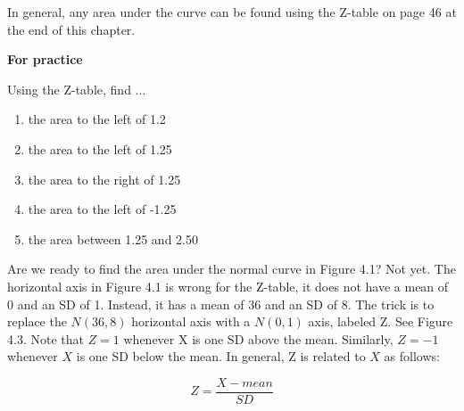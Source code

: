 \documentclass[11pt, chapterprefix=true]{scrbook}\usepackage[]{graphicx}\usepackage[]{color}
\begin{document}
In general, any area under the curve can be found using the Z-table on page 46 at the end of this chapter.

\begin{minipage}[ht]{3cm}

\textbf{For practice}
\end{minipage}
\begin{minipage}[ht]{6cm}

\parbox{6cm}{
  Using the Z-table, find $\dots$

  \begin{enumerate}
  \item the area to the left of 1.2
  \item the area to the left of 1.25
  \item the area to the right of 1.25
  \item the area to the left of -1.25
  \item the area between 1.25 and 2.50
  \end{enumerate}
}
\end{minipage}

Are we ready to find the area under the normal curve in Figure 4.1?  Not yet.  The horizontal axis in Figure 4.1 is wrong for the Z-table, it does not have a mean of 0 and an SD of 1. Instead, it has a mean of 36 and an SD of 8.  The trick is to replace the $N(36, 8)$ horizontal axis with a $N(0, 1)$ axis, labeled Z.  See Figure 4.3.  Note that $Z = 1$ whenever X is one SD above the mean.  Similarly, $Z = -1$ whenever $X$ is one SD below the mean.  In general, Z is related to $X$ as follows:

  \begin{equation} Z = \frac{X - mean}{SD} \end{equation}
\end{document}
